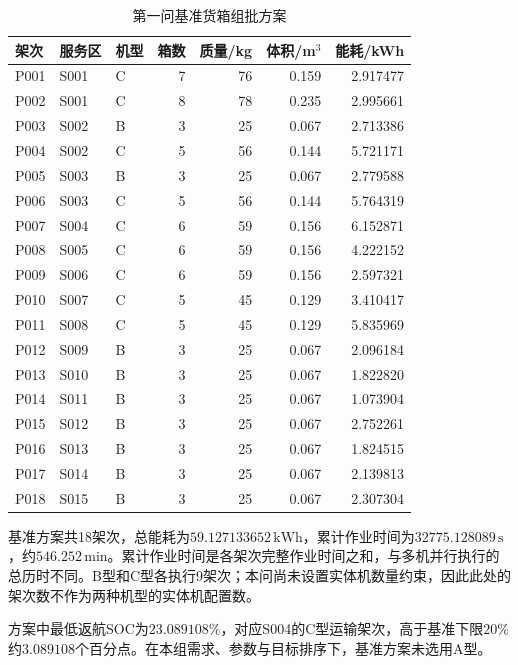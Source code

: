 \documentclass[bwprint]{gmcmthesis}
\begin{document}
\begin{table}[htbp]
    \centering
    \caption{第一问基准货箱组批方案}
    \label{tab:q1_batches}
    \small
    \begin{tabular}{lllrrrr}
        \toprule
        架次 & 服务区 & 机型 & 箱数 &
        质量/kg & 体积/m$^3$ & 能耗/kWh \\
        \midrule
        P001 & S001 & C & 7 & 76 & 0.159 & 2.917477 \\
        P002 & S001 & C & 8 & 78 & 0.235 & 2.995661 \\
        P003 & S002 & B & 3 & 25 & 0.067 & 2.713386 \\
        P004 & S002 & C & 5 & 56 & 0.144 & 5.721171 \\
        P005 & S003 & B & 3 & 25 & 0.067 & 2.779588 \\
        P006 & S003 & C & 5 & 56 & 0.144 & 5.764319 \\
        P007 & S004 & C & 6 & 59 & 0.156 & 6.152871 \\
        P008 & S005 & C & 6 & 59 & 0.156 & 4.222152 \\
        P009 & S006 & C & 6 & 59 & 0.156 & 2.597321 \\
        P010 & S007 & C & 5 & 45 & 0.129 & 3.410417 \\
        P011 & S008 & C & 5 & 45 & 0.129 & 5.835969 \\
        P012 & S009 & B & 3 & 25 & 0.067 & 2.096184 \\
        P013 & S010 & B & 3 & 25 & 0.067 & 1.822820 \\
        P014 & S011 & B & 3 & 25 & 0.067 & 1.073904 \\
        P015 & S012 & B & 3 & 25 & 0.067 & 2.752261 \\
        P016 & S013 & B & 3 & 25 & 0.067 & 1.824515 \\
        P017 & S014 & B & 3 & 25 & 0.067 & 2.139813 \\
        P018 & S015 & B & 3 & 25 & 0.067 & 2.307304 \\
        \bottomrule
    \end{tabular}
\end{table}

基准方案共18架次，总能耗为$59.127133652\,\mathrm{kWh}$，累计作业时间为$32775.128089\,\mathrm{s}$，约$546.252\,\mathrm{min}$。累计作业时间是各架次完整作业时间之和，与多机并行执行的总历时不同。B型和C型各执行9架次；本问尚未设置实体机数量约束，因此此处的架次数不作为两种机型的实体机配置数。

方案中最低返航SOC为$23.089108\%$，对应S004的C型运输架次，高于基准下限$20\%$约$3.089108$个百分点。在本组需求、参数与目标排序下，基准方案未选用A型。
\end{document}
